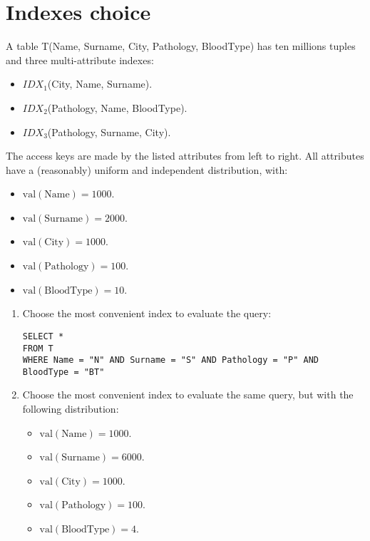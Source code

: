 \section{Indexes choice}

A table T(Name, Surname, City, Pathology, BloodType) has ten millions tuples and three multi-attribute indexes:
\begin{itemize}
    \item $IDX_1$(City, Name, Surname).
    \item $IDX_2$(Pathology, Name, BloodType).
    \item $IDX_3$(Pathology, Surname, City).
\end{itemize}
The access keys are made by the listed attributes from left to right. 
All attributes have a (reasonably) uniform and independent distribution, with:
\begin{itemize}
    \item $\text{val}(\text{Name}) = 1000$.
    \item $\text{val}(\text{Surname}) = 2000$.
    \item $\text{val}(\text{City}) = 1000$.
    \item $\text{val}(\text{Pathology}) = 100$.
    \item $\text{val}(\text{BloodType}) = 10$.
\end{itemize}
\begin{enumerate}
    \item Choose the most convenient index to evaluate the query:
        \begin{lstlisting}[style=SQL]
SELECT *
FROM T
WHERE Name = "N" AND Surname = "S" AND Pathology = "P" AND BloodType = "BT"
        \end{lstlisting}
    \item Choose the most convenient index to evaluate the same query, but with the following distribution: 
    \begin{itemize}
        \item $\text{val}(\text{Name}) = 1000$.
        \item $\text{val}(\text{Surname}) = 6000$.
        \item $\text{val}(\text{City}) = 1000$.
        \item $\text{val}(\text{Pathology}) = 100$.
        \item $\text{val}(\text{BloodType}) = 4$.
    \end{itemize}
\end{enumerate}

